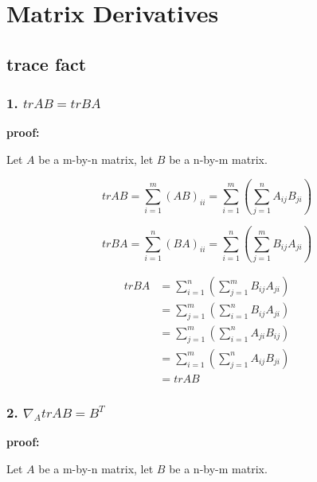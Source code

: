 \section {Matrix Derivatives}

\subsection{trace fact}

\subsubsection {1. $trAB = trBA$}

\textbf{proof:}

Let $A$ be a m-by-n matrix, let $B$ be a n-by-m matrix.

\begin{equation}
trAB = \sum_{i=1}^{m} (AB)_{ii} = \sum_{i=1}^{m} (\sum_{j=1}^{n} A_{ij}B_{ji})
\end{equation}

\begin{equation}
trBA = \sum_{i=1}^{n} (BA)_{ii} = \sum_{i=1}^{n} (\sum_{j=1}^{m} B_{ij}A_{ji})
\end{equation}

\begin{equation}
\begin{split}
trBA &= \sum_{i=1}^{n} (\sum_{j=1}^{m} B_{ij}A_{ji}) \\
&= \sum_{j=1}^{m} (\sum_{i=1}^{n} B_{ij}A_{ji}) \\
&= \sum_{j=1}^{m} (\sum_{i=1}^{n} A_{ji}B_{ij}) \\
&= \sum_{i=1}^{m} (\sum_{j=1}^{n} A_{ij}B_{ji}) \\
&= trAB
\end{split}
\end{equation}

\subsubsection {2. $\nabla_A trAB = B^T$}

\textbf{proof:}

Let $A$ be a m-by-n matrix, let $B$ be a n-by-m matrix.

